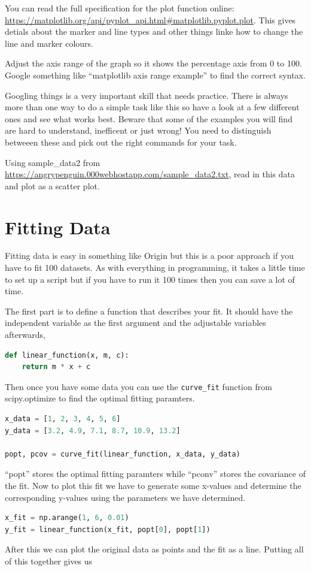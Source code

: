 You can read the full specification for the plot function online: \url{https://matplotlib.org/api/pyplot_api.html#matplotlib.pyplot.plot}. This gives detials about the marker and line types and other things linke how to change the line and marker colours.
\begin{task}Adjust the axis range of the graph so it shows the percentage axis from 0 to 100. Google something like ``matplotlib axis range example'' to find the correct syntax.\end{task}
Googling things is a very important skill that needs practice. There is always more than one way to do a simple task like this so have a look at a few different ones and see what works best. Beware that some of the examples you will find are hard to understand, inefficent or just wrong! You need to distinguish betweeen these and pick out the right commands for your task.
\begin{task}Using sample\_data2 from \url{https://angrypenguin.000webhostapp.com/sample_data2.txt}, read in this data and plot as a scatter plot.\end{task}

\section{Fitting Data}
	Fitting data is easy in something like Origin but this is a poor approach if you have to fit 100 datasets. As with everything in programming, it takes a little time to set up a script but if you have to run it 100 times then you can save a lot of time.

The first part is to define a function that describes your fit. It should have the independent variable as the first argument and the adjustable variables afterwards,
\begin{lstlisting}[language=Python]
def linear_function(x, m, c):
	return m * x + c
\end{lstlisting}

Then once you have some data you can use the \texttt{curve\_fit} function from scipy.optimize to find the optimal fitting paramters.
\begin{lstlisting}[language=Python]
x_data = [1, 2, 3, 4, 5, 6]
y_data = [3.2, 4.9, 7.1, 8.7, 10.9, 13.2]

popt, pcov = curve_fit(linear_function, x_data, y_data)
\end{lstlisting}
``popt'' stores the optimal fitting paramters while ``pconv'' stores the covariance of the fit.
Now to plot this fit we have to generate some x-values and determine the corresponding y-values using the parameters we have determined.
\begin{lstlisting}[language=Python]
x_fit = np.arange(1, 6, 0.01)
y_fit = linear_function(x_fit, popt[0], popt[1])
\end{lstlisting}
After this we can plot the original data as points and the fit as a line. Putting all of this together gives us

